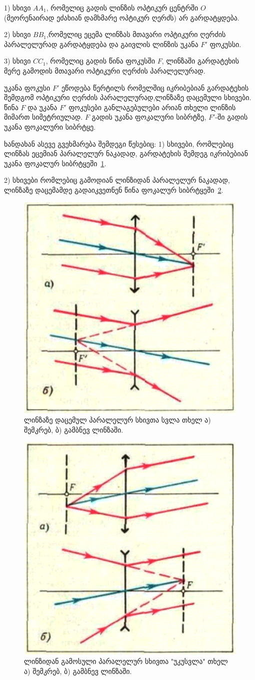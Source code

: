 \documentclass{book}
\begin{document}
1) სხივი $AA_1$, რომელიც გადის ლინზის ოპტიკურ ცენტრში $O$ (მეორენაირად ეძახიან დამხმარე ოპტიკურ ღერძს) არ გარდატყდება.

2) სხივი $BB_1$,რომელიც ეცემა ლინზას მთავარი ოპტიკური ღერძის პარალელურად გარდატყდება და გაივლის ლინზის უკანა $F'$ ფოკუსსი.

3) სხივი $CC_1$, რომელიც გადის წინა ფოკუსში $F$, ლინზაში გარდატეხის მერე გამოდის მთავარი ოპტიკური ღერძის პარალელურად.

უკანა ფოკუსი $F'$ ეწოდება წერტილს რომელშიც იკრიბებიან გარდატეხის შემდგომ ოპტიკური ღერძის პარალელურად,ლინზაზე დაცემული სხივები. წინა $F$ და უკანა $F'$ ფოკუსები განლაგებულები არიან თხელი ლინზის მიმართ სიმეტრიულად. $F$ გადის უკანა ფოკალური სიბრტზე, $F'$-ში გადის უკანა ფოკალური სიბრტყე.

ხანდახან ასევე გვეხმარება შემდეგი წესებიც:
1) სხივები, რომლებიც ლინზას ეცემიან პარალელურ ნაკადად, გარდატეხის შემდეგ იკრიბებიან უკანა ფოკალურ სიბრტყეში~\ref{fig:optics_2}.

2) სხივები რომლებიც გამოდიან ლინზიდან პარალელურ ნაკადად, ლინზაზე დაცემამდე გადაიკვეთნენ წინა ფოკალურ სიბრტყეში~\ref{fig:optics_3}. 

		\begin{figure}[h]
		   \centering
           \includegraphics[width=0.5\columnwidth]{figures/optics_2}
           \caption{ლინზაზე დაცემულ პარალელურ სხივთა სვლა თხელ ა) შემკრებ, ბ) გამბნევ ლინზაში.}
           \label{fig:optics_2}
        \end{figure}

		\begin{figure}[h]
		   \centering
           \includegraphics[width=0.5\columnwidth]{figures/optics_3}
           \caption{ლინზიდან გამოსული პარალელურ სხივთა "უკუსვლა" თხელ ა) შემკრებ, ბ) გამბნევ ლინზაში.}
           \label{fig:optics_3}
        \end{figure}
\end{document}
